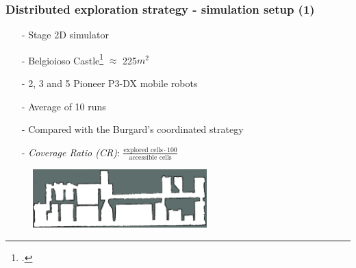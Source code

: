 \begin{frame}
	\frametitle{Distributed exploration strategy - simulation setup (1)}
	\begin{itemize}
		\item[-] Stage 2D simulator
		\item[-] Belgioioso Castle\footcite{fr_dataset} $\approx$ 225$m^{2}$
		\item[-] 2, 3 and 5 Pioneer P3-DX mobile robots
		\item[-] Average of 10 runs 
		\item[-] Compared with the Burgard's coordinated strategy
		\item[-] \textit{Coverage Ratio (CR)}:  \( \frac{\text{explored cells} \cdot 100}{\text{accessible cells}} \)
	\end{itemize}
	\begin{figure}
		\centering
		\includegraphics[width=0.6\textwidth]{figures/map}
	\end{figure}
\end{frame}

